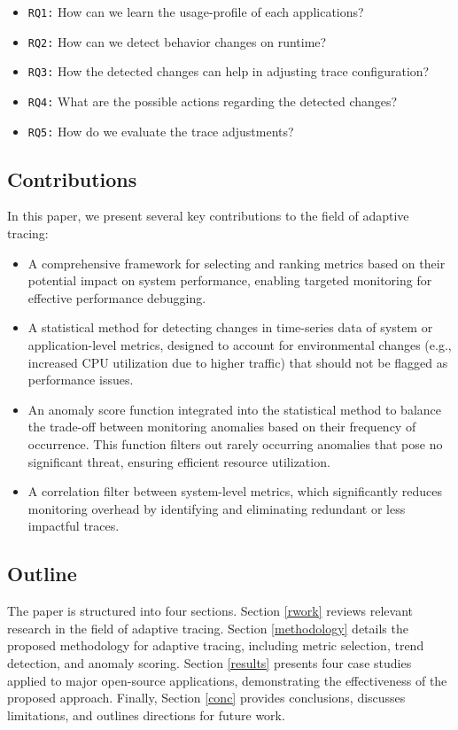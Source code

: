 \documentclass[pdflatex,sn-nature]{sn-jnl}%
\theoremstyle{thmstyleone}%
\theoremstyle{thmstyletwo}%
\theoremstyle{thmstylethree}%
\begin{document}
\begin{itemize}
  \item \verb|RQ1:| How can we learn the usage-profile of each applications?
  \item \verb|RQ2:| How can we detect behavior changes on runtime?
  \item \verb|RQ3:| How the detected changes can help in adjusting trace configuration?
  \item \verb|RQ4:| What are the possible actions regarding the detected changes?
  \item \verb|RQ5:| How do we evaluate the trace adjustments?
\end{itemize}

\subsection{Contributions}
In this paper, we present several key contributions to the field of adaptive tracing:
\begin{itemize}
\item A comprehensive framework for selecting and ranking metrics based on their potential impact on system performance, enabling targeted monitoring for effective performance debugging.
\item A statistical method for detecting changes in time-series data of system or application-level metrics, designed to account for environmental changes (e.g., increased CPU utilization due to higher traffic) that should not be flagged as performance issues.
\item An anomaly score function integrated into the statistical method to balance the trade-off between monitoring anomalies based on their frequency of occurrence. This function filters out rarely occurring anomalies that pose no significant threat, ensuring efficient resource utilization.
\item A correlation filter between system-level metrics, which significantly reduces monitoring overhead by identifying and eliminating redundant or less impactful traces.
\end{itemize}

\subsection{Outline}
The paper is structured into four sections. Section \ref{rwork} reviews relevant research in the field of adaptive tracing. Section \ref{methodology} details the proposed methodology for adaptive tracing, including metric selection, trend detection, and anomaly scoring. Section \ref{results} presents four case studies applied to major open-source applications, demonstrating the effectiveness of the proposed approach. Finally, Section \ref{conc} provides conclusions, discusses limitations, and outlines directions for future work.
\end{document}
